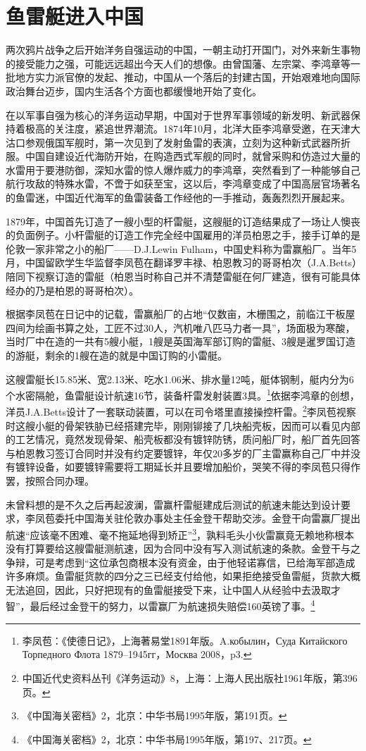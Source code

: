 \documentclass[12pt,UTF8]{ctexbook}
\begin{document}
\section{鱼雷艇进入中国}

两次鸦片战争之后开始洋务自强运动的中国，一朝主动打开国门，对外来新生事物的接受能力之强，可能远远超出今天人们的想像。由曾国藩、左宗棠、李鸿章等一批地方实力派官僚的发起、推动，中国从一个落后的封建古国，开始艰难地向国际政治舞台迈步，国内生活各个方面也都缓慢地开始了变化。

在以军事自强为核心的洋务运动早期，中国对于世界军事领域的新发明、新武器保持着极高的关注度，紧追世界潮流。1874年10月，北洋大臣李鸿章受邀，在天津大沽口参观俄国军舰时，第一次见到了发射鱼雷的表演，立刻为这种新式武器所折服。中国自建设近代海防开始，在购造西式军舰的同时，就曾采购和仿造过大量的水雷用于要港防御，深知水雷的惊人爆炸威力的李鸿章，突然看到了一种能够自己航行攻敌的特殊水雷，不啻于如获至宝，这以后，李鸿章变成了中国高层官场著名的鱼雷迷，中国近代海军的鱼雷装备工作经他的一手推动，轰轰烈烈开展起来。

1879年，中国首先订造了一艘小型的杆雷艇，这艘艇的订造结果成了一场让人懊丧的负面例子。小杆雷艇的订造工作完全经中国雇用的洋员柏恩之手，接手订单的是伦敦一家非常之小的船厂——D.J.Lewin Fulham，中国史料称为雷赢船厂。当年5月，中国留欧学生华监督李凤苞在翻译罗丰禄、柏恩教习的哥哥柏次（J.A.Betts）陪同下视察订造的雷艇（柏恩当时称自己并不清楚雷艇在何厂建造，很有可能具体经办的乃是柏恩的哥哥柏次）。

根据李凤苞在日记中的记载，雷赢船厂的占地“仅数亩，木栅围之，前临江干板屋四间为绘画书算之处，工匠不过30人，汽机唯八匹马力者一具”，场面极为寒酸，当时厂中在造的一共有5艘小艇，1艘是英国海军部订购的雷艇、3艘是暹罗国订造的游艇，剩余的1艘在造的就是中国订购的小雷艇。

这艘雷艇长15.85米、宽2.13米、吃水1.06米、排水量12吨，艇体钢制，艇内分为6个水密隔舱，鱼雷艇设计航速16节，装备杆雷发射装置3具。\footnote{李凤苞：《使德日记》，上海著易堂1891年版。\cyrillicfont A.кобылин，Суда Китайского Торпедного Флота 1879--1945гг，Москва 2008，p3.}依据李鸿章的创想，洋员J.A.Betts设计了一套联动装置，可以在司令塔里直接操控杆雷。\footnote{中国近代史资料丛刊《洋务运动》8，上海：上海人民出版社1961年版，第396页。}李凤苞视察时这艘小艇的骨架铁胁已经搭建完毕，刚刚铆接了几块船壳板，因而可以看见内部的工艺情况，竟然发现骨架、船壳板都没有镀锌防锈，质问船厂时，船厂首先回答与柏恩教习签订合同时并没有约定要镀锌，年仅20多岁的厂主雷赢称自己厂中并没有镀锌设备，如要镀锌需要将工期延长并且要增加船价，哭笑不得的李凤苞只得作罢，按照合同办理。

未曾料想的是不久之后再起波澜，雷赢杆雷艇建成后测试的航速未能达到设计要求，李凤苞委托中国海关驻伦敦办事处主任金登干帮助交涉。金登干向雷赢厂提出航速“应该毫不困难、毫不拖延地得到矫正”\footnote{《中国海关密档》2，北京：中华书局1995年版，第191页。}，孰料毛头小伙雷赢竟无赖地称根本没有打算要给这艘雷艇测航速，因为合同中没有写入测试航速的条款。金登干与之争辩，可是考虑到“这位承包商根本没有资金，由于他轻诺寡信，已给海军部造成许多麻烦。鱼雷艇货款的四分之三已经支付给他，如果拒绝接受鱼雷艇，货款大概无法追回，因此，只好把现有的鱼雷艇接受下来，让中国人从经验中去汲取才智”，最后经过金登干的努力，以雷赢厂为航速损失赔偿160英镑了事。\footnote{《中国海关密档》2，北京：中华书局1995年版，第197、217页。}
\end{document}
